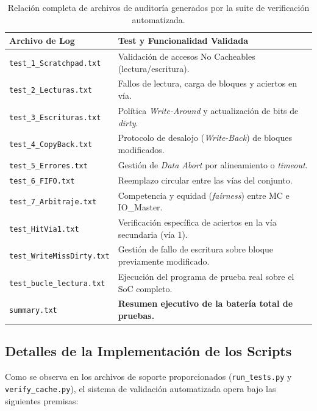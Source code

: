 \documentclass[12pt,a4paper]{article}
\begin{document}
\begin{table}[H]
\centering
\footnotesize
\renewcommand{\arraystretch}{1.3} %
\begin{tabular}{|l|l|}
\hline
\rowcolor[HTML]{EFEFEF} 
\textbf{Archivo de Log} & \textbf{Test y Funcionalidad Validada} \\ \hline
\texttt{test\_1\_Scratchpad.txt} & Validación de accesos No Cacheables (lectura/escritura). \\ \hline
\texttt{test\_2\_Lecturas.txt}   & Fallos de lectura, carga de bloques y aciertos en vía. \\ \hline
\texttt{test\_3\_Escrituras.txt} & Política \textit{Write-Around} y actualización de bits de \textit{dirty}. \\ \hline
\texttt{test\_4\_CopyBack.txt}   & Protocolo de desalojo (\textit{Write-Back}) de bloques modificados. \\ \hline
\texttt{test\_5\_Errores.txt}    & Gestión de \textit{Data Abort} por alineamiento o \textit{timeout}. \\ \hline
\texttt{test\_6\_FIFO.txt}       & Reemplazo circular entre las vías del conjunto. \\ \hline
\texttt{test\_7\_Arbitraje.txt}  & Competencia y equidad (\textit{fairness}) entre MC e IO\_Master. \\ \hline
\texttt{test\_HitVia1.txt}       & Verificación específica de aciertos en la vía secundaria (vía 1). \\ \hline
\texttt{test\_WriteMissDirty.txt}& Gestión de fallo de escritura sobre bloque previamente modificado. \\ \hline
\texttt{test\_bucle\_lectura.txt}& Ejecución del programa de prueba real sobre el SoC completo. \\ \hline
\texttt{summary.txt}             & \textbf{Resumen ejecutivo de la batería total de pruebas.} \\ \hline
\end{tabular}
\caption{Relación completa de archivos de auditoría generados por la suite de verificación automatizada.}
\label{tab:logs_verificacion}
\end{table}

\subsection{Detalles de la Implementación de los Scripts}

Como se observa en los archivos de soporte proporcionados (\texttt{run\_tests.py} y \texttt{verify\_cache.py}), el sistema de validación automatizada opera bajo las siguientes premisas:
\end{document}
